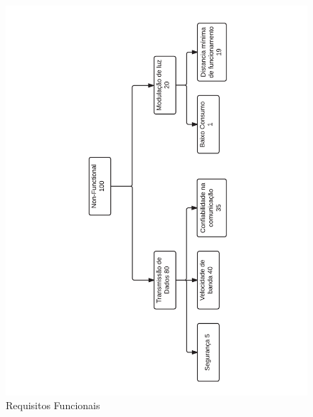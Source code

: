 	\begin{figure}[h!]
		\caption{\label{fig_req2} Requisitos Funcionais }
		\centering
		\includegraphics[width=1.0\textwidth, trim={1cm 1cm 1cm 1cm}, clip]{ReqTree2.pdf}
	\end{figure}
	
